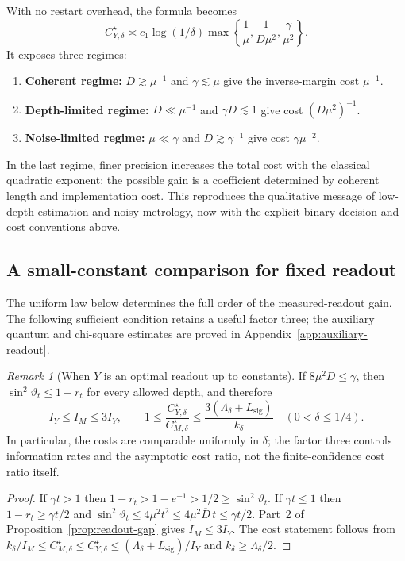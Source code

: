 \documentclass[11pt,a4paper]{article}
\theoremstyle{definition}
\theoremstyle{remark}
\newtheorem{remark}[theorem]{Remark}
\numberwithin{equation}{section}
\begin{document}
With no restart overhead, the formula becomes
\begin{equation}\label{eq:threeway}
 C_{Y,\delta}^\star\asymp c_1\log(1/\delta)
 \max\left\{\frac1\mu,\frac1{D\mu^2},\frac{\gamma}{\mu^2}\right\}.
\end{equation}
It exposes three regimes:
\begin{enumerate}
 \item \textbf{Coherent regime:} $D\gtrsim\mu^{-1}$ and
 $\gamma\lesssim\mu$ give the inverse-margin cost $\mu^{-1}$.
 \item \textbf{Depth-limited regime:} $D\ll\mu^{-1}$ and
 $\gamma D\lesssim1$ give cost $(D\mu^2)^{-1}$.
 \item \textbf{Noise-limited regime:} $\mu\ll\gamma$ and
 $D\gtrsim\gamma^{-1}$ give cost $\gamma\mu^{-2}$.
\end{enumerate}
In the last regime, finer precision increases the total cost with the
classical quadratic exponent; the possible gain is a coefficient determined
by coherent length and implementation cost. This reproduces the qualitative
message of low-depth estimation and noisy metrology, now with the explicit
binary decision and cost conventions above.

\subsection{A small-constant comparison for fixed readout}
The uniform law below determines the full order of the measured-readout
gain. The following sufficient condition retains a useful factor three;
the auxiliary quantum and chi-square estimates are proved in
Appendix~\ref{app:auxiliary-readout}.

\begin{remark}[When $Y$ is an optimal readout up to constants]
\label{cor:y-optimal}
If $8\mu^2\overline D\le\gamma$, then $\sin^2\vartheta_t\le 1-r_t$ for
every allowed depth, and therefore
\[
I_Y\le I_M\le 3I_Y,\qquad
1\leq\frac{C^\star_{Y,\delta}}{C^\star_{M,\delta}}
\leq\frac{3(\Lambda_\delta+L_{\mathrm{sig}})}{k_\delta}
\quad(0<\delta\leq1/4).
\]
In particular, the costs are comparable uniformly in $\delta$; the
factor three controls information rates and the asymptotic cost ratio,
not the finite-confidence cost ratio itself.
\end{remark}

\begin{proof}
If $\gamma t>1$ then $1-r_t>1-e^{-1}>1/2\ge\sin^2\vartheta_t$. If
$\gamma t\le 1$ then $1-r_t\ge\gamma t/2$ and
$\sin^2\vartheta_t\le 4\mu^2t^2\le 4\mu^2\overline D\,t\le\gamma t/2$.
Part~2 of Proposition~\ref{prop:readout-gap} gives $I_M\le 3I_Y$.
The cost statement follows from $k_\delta/I_M\le C^\star_{M,\delta}\le
C^\star_{Y,\delta}\le(\Lambda_\delta+L_{\mathrm{sig}})/I_Y$ and
$k_\delta\ge\Lambda_\delta/2$.
\end{proof}
\end{document}
